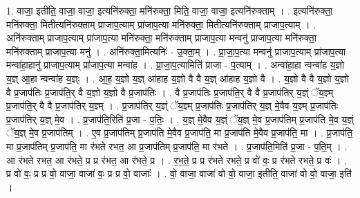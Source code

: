 \documentclass[17pt]{extarticle}
\begin{document}
1. वाजा॒ इतीति॒ वाजा॒ वाजा॒ इत्यनि॑रुक्ता॒ मनि॑रुक्ता॒ मिति॒ वाजा॒ वाजा॒ इत्यनि॑रुक्ताम् । . इत्यनि॑रुक्ता॒ मनि॑रुक्ता॒ मितीत्यनि॑रुक्ताम् प्राजाप॒त्याम् प्रा॑जाप॒त्या मनि॑रुक्ता॒ मितीत्यनि॑रुक्ताम् प्राजाप॒त्याम् । . अनि॑रुक्ताम् प्राजाप॒त्याम् प्रा॑जाप॒त्या मनि॑रुक्ता॒ मनि॑रुक्ताम् प्राजाप॒त्या मन्वनु॑ प्राजाप॒त्या मनि॑रुक्ता॒ मनि॑रुक्ताम् प्राजाप॒त्या मनु॑ । . अनि॑रुक्ता॒मित्यनिः॑ - उ॒क्ता॒म् । . प्रा॒जा॒प॒त्या मन्वनु॑ प्राजाप॒त्याम् प्रा॑जाप॒त्या मन्वा॑हा॒हानु॑ प्राजाप॒त्याम् प्रा॑जाप॒त्या मन्वा॑ह । . प्रा॒जा॒प॒त्यामिति॑ प्राजा - प॒त्याम् । . अन्वा॑हा॒हा न्वन्वा॑ह य॒ज्ञो य॒ज्ञ् आ॒हा न्वन्वा॑ह य॒ज्ञ्ः । . आ॒ह॒ य॒ज्ञो य॒ज्ञ् आ॑हाह य॒ज्ञो वै वै य॒ज्ञ् आ॑हाह य॒ज्ञो वै । . य॒ज्ञो वै वै य॒ज्ञो य॒ज्ञो वै प्र॒जाप॑तिः प्र॒जाप॑ति॒र् वै य॒ज्ञो य॒ज्ञो वै प्र॒जाप॑तिः । . वै प्र॒जाप॑तिः प्र॒जाप॑ति॒र् वै वै प्र॒जाप॑तिर् य॒ज्ञ्ं ॅय॒ज्ञ्म् प्र॒जाप॑ति॒र् वै वै प्र॒जाप॑तिर् य॒ज्ञ्म् । . प्र॒जाप॑तिर् य॒ज्ञ्ं ॅय॒ज्ञ्म् प्र॒जाप॑तिः प्र॒जाप॑तिर् य॒ज्ञ् मे॒वैव य॒ज्ञ्म् प्र॒जाप॑तिः प्र॒जाप॑तिर् य॒ज्ञ् मे॒व । . प्र॒जाप॑ति॒रिति॑ प्र॒जा - प॒तिः॒ । . य॒ज्ञ् मे॒वैव य॒ज्ञ्ं ॅय॒ज्ञ् मे॒व प्र॒जाप॑तिम् प्र॒जाप॑ति मे॒व य॒ज्ञ्ं ॅय॒ज्ञ् मे॒व प्र॒जाप॑तिम् । . ए॒व प्र॒जाप॑तिम् प्र॒जाप॑ति मे॒वैव प्र॒जाप॑ति॒ मा प्र॒जाप॑ति मे॒वैव प्र॒जाप॑ति॒ मा । . प्र॒जाप॑ति॒ मा प्र॒जाप॑तिम् प्र॒जाप॑ति॒ मा र॑भते रभत॒ आ प्र॒जाप॑तिम् प्र॒जाप॑ति॒ मा र॑भते । . प्र॒जाप॑ति॒मिति॑ प्र॒जा - प॒ति॒म् । . आ र॑भते रभत॒ आ र॑भते॒ प्र प्र र॑भत॒ आ र॑भते॒ प्र । . र॒भ॒ते॒ प्र प्र र॑भते रभते॒ प्र वो॑ वः॒ प्र र॑भते रभते॒ प्र वः॑ । . प्र वो॑ वः॒ प्र प्र वो॒ वाजा॒ वाजा॑ वः॒ प्र प्र वो॒ वाजाः᳚ । . वो॒ वाजा॒ वाजा॑ वो वो॒ वाजा॒ इतीति॒ वाजा॑ वो वो॒ वाजा॒ इति॑ । \newline
\end{document}
